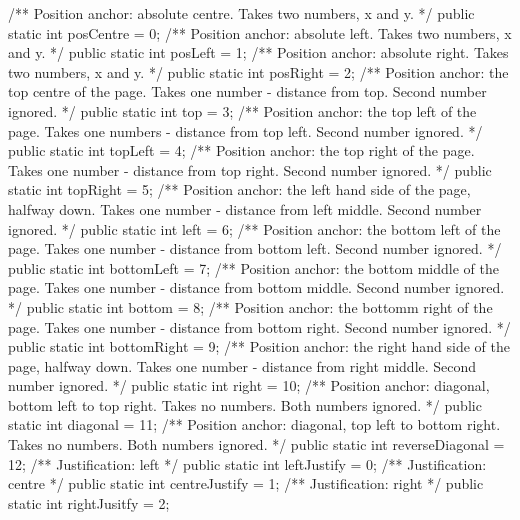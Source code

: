 /** Position anchor: absolute centre. Takes two numbers, x and y. */
public static int posCentre = 0;
/** Position anchor: absolute left. Takes two numbers, x and y. */
public static int posLeft = 1;
/** Position anchor: absolute right. Takes two numbers, x and y. */
public static int posRight = 2;
/** Position anchor: the top centre of the page.
Takes one number - distance from top. Second number ignored. */
public static int top = 3;
/** Position anchor: the top left of the page.
Takes one numbers - distance from top left. Second number ignored. */
public static int topLeft = 4;
/** Position anchor: the top right of the page.
Takes one number - distance from top right. Second number ignored. */
public static int topRight = 5;
/** Position anchor: the left hand side of the page, halfway down.
Takes one number - distance from left middle. Second number ignored. */
public static int left = 6;
/** Position anchor: the bottom left of the page.
Takes one number - distance from bottom left. Second number ignored. */
public static int bottomLeft = 7;
/** Position anchor: the bottom middle of the page.
Takes one number - distance from bottom middle. Second number ignored. */
public static int bottom = 8;
/** Position anchor: the bottomm right of the page.
Takes one number - distance from bottom right. Second number ignored. */
public static int bottomRight = 9;
/** Position anchor: the right hand side of the page, halfway down.
Takes one number - distance from right middle. Second number ignored. */
public static int right = 10;
/** Position anchor: diagonal, bottom left to top right.
Takes no numbers. Both numbers ignored. */
public static int diagonal = 11;
/** Position anchor: diagonal, top left to bottom right.
Takes no numbers. Both numbers ignored. */
public static int reverseDiagonal = 12;
/** Justification: left */
public static int leftJustify = 0;
/** Justification: centre */
public static int centreJustify = 1;
/** Justification: right */
public static int rightJusitfy = 2;
